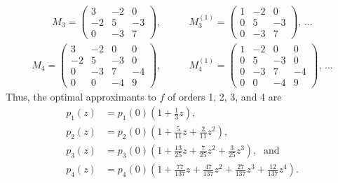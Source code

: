 \documentclass[11 pt,reqno]{amsart}
\theoremstyle{definition}
\theoremstyle{remark}
\numberwithin{equation}{section} \numberwithin{figure}{section}
\begin{document}
      \begin{align*}
                  M_{3}=\left(
                  \begin{array}{ccc}
                              3       &   -2  &   0\\
                              -2  &   5       &   -3\\
                              0       &   -3  &   7
                  \end{array}\right),\qquad
                  &M_{3}^{(1)}=\left(
                  \begin{array}{ccc}
                              1       &   -2  &   0\\
                              0       &   5       &   -3\\
                              0       &   -3  &   7
                  \end{array}\right), \, \hdots
      \end{align*}
      \begin{align*}
                  M_{4}=\left(
                  \begin{array}{cccc}
                              3       &   -2  &   0       &   0\\
                              -2  &   5       &   -3  &   0\\
                              0       &   -3  &   7       &   -4\\
                              0       &   0       &   -4  &   9
                  \end{array}\right),\qquad
                  &M_{4}^{(1)}=\left(
                  \begin{array}{cccc}
                              1       &   -2  &   0       &   0\\
                              0       &   5       &   -3  &   0\\
                              0       &   -3  &   7       &   -4\\
                              0       &   0       &   -4  &   9
                  \end{array}\right), \, \hdots
      \end{align*}
      Thus, the optimal approximants to $f$ of orders 1, 2, 3, and 4 are
      \begin{align*}
                  p_{1}(z)&=p_{1}(0)\left(1+\frac{1}{3}z\right),\\
                  p_{2}(z)&=p_{2}(0)\left(1+\frac{5}{11}z+\frac{2}{11}z^2\right),\\
                  p_{3}(z)&=p_{3}(0)\left(1+\frac{13}{25}z+\frac{7}{25}z^2+\frac{3}{25}z^3\right),
                  \;\text{ and }\\
                  p_{4}(z)&=p_{4}(0)\left(1+\frac{77}{137}z+\frac{47}{137}z^2
                  +\frac{27}{137}z^3+\frac{12}{137}z^4\right).
      \end{align*}
\end{document}
